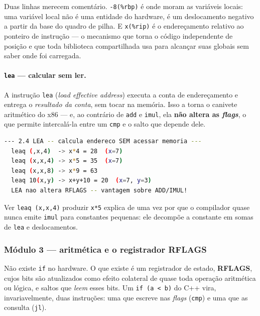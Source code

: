Duas linhas merecem comentário. \texttt{-8(\%rbp)} é onde moram as variáveis
locais: uma variável local não é uma entidade do hardware, é um deslocamento
negativo a partir da base do quadro de pilha. E \texttt{x(\%rip)} é o
endereçamento relativo ao ponteiro de instrução --- o mecanismo que torna o
código independente de posição e que toda biblioteca compartilhada usa para
alcançar suas globais sem saber onde foi carregada.

\paragraph{\texttt{lea} --- calcular sem ler.} A instrução \texttt{lea}
(\emph{load effective address}) executa a conta de endereçamento e entrega o
\emph{resultado da conta}, sem tocar na memória. Isso a torna o canivete
aritmético do x86 --- e, ao contrário de \texttt{add} e \texttt{imul}, ela
\textbf{não altera as \emph{flags}}, o que permite intercalá-la entre um
\texttt{cmp} e o salto que depende dele.

\begin{lstlisting}[style=bt, language=bash,
    caption={Saída medida de \texttt{dist/bin/asm\_02\_memory}.}]
--- 2.4 LEA -- calcula endereco SEM acessar memoria ---
  leaq (,x,4)  -> x*4 = 28  (x=7)
  leaq (x,x,4) -> x*5 = 35  (x=7)
  leaq (x,x,8) -> x*9 = 63
  leaq 10(x,y) -> x+y+10 = 20  (x=7, y=3)
  LEA nao altera RFLAGS -- vantagem sobre ADD/IMUL!
\end{lstlisting}

Ver \texttt{leaq (x,x,4)} produzir \texttt{x*5} explica de uma vez por que o
compilador quase nunca emite \texttt{imul} para constantes pequenas: ele
decompõe a constante em somas de \texttt{lea} e deslocamentos.

\subsubsection{Módulo 3 --- aritmética e o registrador RFLAGS}

\begin{porque}
Não existe \texttt{if} no hardware. O que existe é um registrador de estado,
\textbf{RFLAGS}, cujos bits são atualizados como efeito colateral de quase toda
operação aritmética ou lógica, e saltos que \emph{leem} esses bits. Um
\texttt{if (a < b)} do C++ vira, invariavelmente, duas instruções: uma que
escreve nas \emph{flags} (\texttt{cmp}) e uma que as consulta (\texttt{jl}).
\end{porque}

